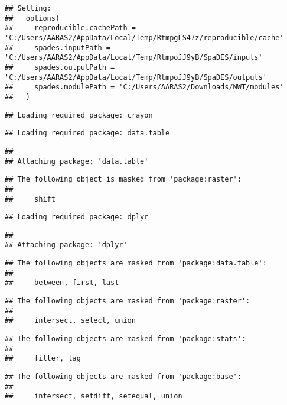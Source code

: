 \documentclass[]{article}
\begin{document}
\begin{verbatim}
## Setting:
##   options(
##     reproducible.cachePath = 'C:/Users/AARAS2/AppData/Local/Temp/RtmpgLS47z/reproducible/cache'
##     spades.inputPath = 'C:/Users/AARAS2/AppData/Local/Temp/RtmpoJJ9yB/SpaDES/inputs'
##     spades.outputPath = 'C:/Users/AARAS2/AppData/Local/Temp/RtmpoJJ9yB/SpaDES/outputs'
##     spades.modulePath = 'C:/Users/AARAS2/Downloads/NWT/modules'
##   )
\end{verbatim}

\begin{verbatim}
## Loading required package: crayon
\end{verbatim}

\begin{verbatim}
## Loading required package: data.table
\end{verbatim}

\begin{verbatim}
## 
## Attaching package: 'data.table'
\end{verbatim}

\begin{verbatim}
## The following object is masked from 'package:raster':
## 
##     shift
\end{verbatim}

\begin{verbatim}
## Loading required package: dplyr
\end{verbatim}

\begin{verbatim}
## 
## Attaching package: 'dplyr'
\end{verbatim}

\begin{verbatim}
## The following objects are masked from 'package:data.table':
## 
##     between, first, last
\end{verbatim}

\begin{verbatim}
## The following objects are masked from 'package:raster':
## 
##     intersect, select, union
\end{verbatim}

\begin{verbatim}
## The following objects are masked from 'package:stats':
## 
##     filter, lag
\end{verbatim}

\begin{verbatim}
## The following objects are masked from 'package:base':
## 
##     intersect, setdiff, setequal, union
\end{verbatim}
\end{document}

